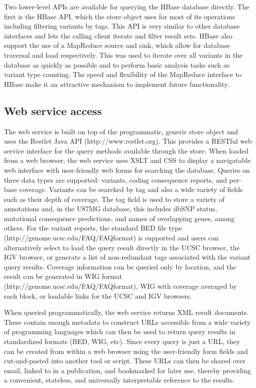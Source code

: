 \documentclass[10pt]{bmc_article}
\newenvironment{bmcformat}{\begin{raggedright}\baselineskip20pt\sloppy\setboolean{publ}{false}}{\end{raggedright}\baselineskip20pt\sloppy}
\begin{document}
\begin{bmcformat}
Two lower-level APIs are available for querying the HBase database directly. The first is the HBase API, which the store object uses for most of its operations including filtering variants by tags. This API is very similar to other database interfaces and lets the calling client iterate and filter result sets. HBase also support the use of a MapReduce source and sink, which allow for database traversal and load respectively. This was used to iterate over all variants in the database as quickly as possible and to perform basic analysis tasks such as variant type counting. The speed and flexibility of the MapReduce interface to HBase make it an attractive mechanism to implement future functionality.

\subsection*{Web service access}

The web service is built on top of the programmatic, generic store object and uses the Restlet Java API (http://www.restlet.org). This provides a RESTful \cite{fielding2000architectural} web service interface for the query methods available through the store. When loaded from a web browser, the web service uses XSLT and CSS to display a navigatable web interface with user-friendly web forms for searching the database. Queries on three data types are supported: variants, coding consequence reports, and per-base coverage. Variants can be searched by tag and also a wide variety of fields such as their depth of coverage. The tag field is used to store a variety of annotations and, in the U87MG database, this includes dbSNP status, mutational consequence predictions, and names of overlapping genes, among others. For the variant reports, the standard BED file type (http://genome.ucsc.edu/FAQ/FAQformat) is supported and users can alternatively select to load the query result directly in the UCSC browser, the IGV browser, or generate a list of non-redundant tags associated with the variant query results. Coverage information can be queried only by location, and the result can be generated in WIG format (http://genome.ucsc.edu/FAQ/FAQformat), WIG with coverage averaged by each block, or loadable links for the UCSC and IGV browsers.

When queried programmatically, the web service returns XML result documents. These contain enough metadata to construct URLs accessible from a wide variety of programming languages which can then be used to return query results in standardized formats (BED, WIG, etc). Since every query is just a URL, they can be created from within a web browser using the user-friendly form fields and cut-and-pasted into another tool or script. These URLs can then be shared over email, linked to in a publication, and bookmarked for later use, thereby providing a convenient, stateless, and universally interpretable reference to the results.


\end{bmcformat}
\end{document}
